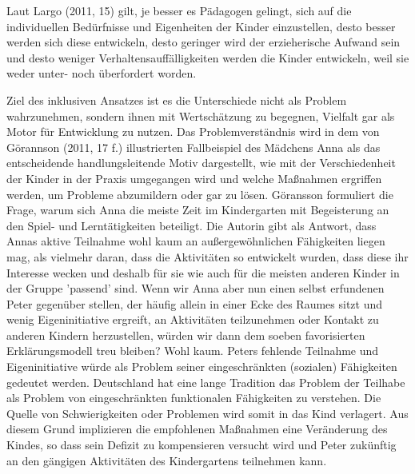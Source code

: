 Laut Largo (2011, 15) gilt, je besser es Pädagogen gelingt, sich auf die individuellen Bedürfnisse und Eigenheiten der Kinder einzustellen, desto besser werden sich diese entwickeln, desto geringer wird der erzieherische Aufwand sein und desto weniger Verhaltensauffälligkeiten werden die Kinder entwickeln, weil sie weder unter- noch überfordert worden.   

Ziel des inklusiven Ansatzes ist es die Unterschiede nicht als Problem wahrzunehmen, sondern ihnen mit Wertschätzung zu begegnen, Vielfalt gar als Motor für Entwicklung zu nutzen. Das Problemverständnis wird in dem von Görannson (2011, 17 f.) illustrierten Fallbeispiel des Mädchens Anna als das entscheidende handlungsleitende Motiv dargestellt, wie mit der Verschiedenheit der Kinder in der Praxis umgegangen wird und welche Maßnahmen ergriffen werden, um Probleme abzumildern oder gar zu lösen. Göransson formuliert die Frage, warum sich Anna die meiste Zeit im Kindergarten mit Begeisterung an den Spiel- und Lerntätigkeiten beteiligt. Die Autorin gibt als Antwort, dass Annas aktive Teilnahme wohl kaum an außergewöhnlichen Fähigkeiten liegen mag, als vielmehr daran, dass die Aktivitäten so entwickelt wurden, dass diese ihr Interesse wecken und deshalb für sie wie auch für die meisten anderen Kinder in der Gruppe 'passend' sind. Wenn wir Anna aber nun einen selbst erfundenen Peter gegenüber stellen, der häufig allein in einer Ecke des Raumes sitzt und wenig Eigeninitiative ergreift, an Aktivitäten teilzunehmen oder Kontakt zu anderen Kindern herzustellen, würden wir dann dem soeben favorisierten Erklärungsmodell treu bleiben? Wohl kaum. Peters fehlende Teilnahme und Eigeninitiative würde als Problem seiner eingeschränkten (sozialen) Fähigkeiten gedeutet werden. Deutschland hat eine lange Tradition das Problem der Teilhabe als Problem von eingeschränkten funktionalen Fähigkeiten zu verstehen. Die Quelle von Schwierigkeiten oder Problemen wird somit in das Kind verlagert. Aus diesem Grund implizieren die empfohlenen Maßnahmen eine Veränderung des Kindes, so dass sein Defizit zu kompensieren versucht wird und Peter zukünftig an den gängigen Aktivitäten des Kindergartens teilnehmen kann. 


